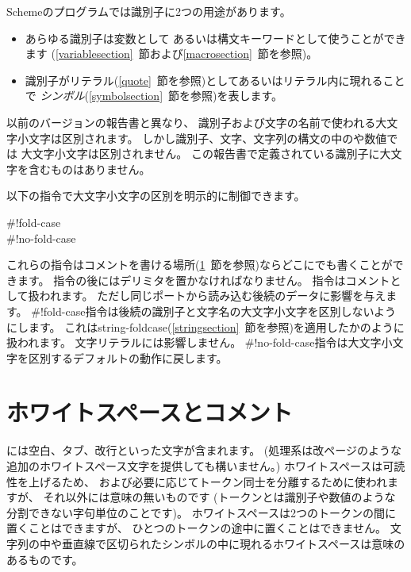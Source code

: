 \vest Schemeのプログラムでは識別子に2つの用途があります。
\begin{itemize}
\item あらゆる識別子は変数として
あるいは構文キーワードとして使うことができます
(\ref{variablesection}~節および\ref{macrosection}~節を参照)。

\item 識別子がリテラル(\ref{quote}~節を参照)としてあるいはリテラル内に現れることで
{\em シンボル}(\ref{symbolsection}~節を参照)を表します。
\end{itemize}

以前のバージョンの報告書\cite{R5RS}と異なり、
識別子および文字の名前で使われる大文字小文字は区別されます。
しかし識別子、文字、文字列の構文の中のや数値では
大文字小文字は区別されません。
この報告書で定義されている識別子に大文字を含むものはありません。

以下の指令で大文字小文字の区別を明示的に制御できます。

\begin{entry}{%
{\cf{}\#!fold-case}\\
{\cf{}\#!no-fold-case}}

これらの指令はコメントを書ける場所(\ref{wscommentsection}~節を参照)ならどこにでも書くことができます。
指令の後にはデリミタを置かなければなりません。
指令はコメントとして扱われます。
ただし同じポートから読み込む後続のデータに影響を与えます。
{\cf{}\#!fold-case}指令は後続の識別子と文字名の大文字小文字を区別しないようにします。
これは{\cf string-foldcase}(\ref{stringsection}~節を参照)を適用したかのように扱われます。
文字リテラルには影響しません。
{\cf{}\#!no-fold-case}指令は大文字小文字を区別するデフォルトの動作に戻します。
\end{entry}



\section{ホワイトスペースとコメント}
\label{wscommentsection}

には空白、タブ、改行といった文字が含まれます。
(処理系は改ページのような追加のホワイトスペース文字を提供しても構いません。)
ホワイトスペースは可読性を上げるため、
および必要に応じてトークン同士を分離するために使われますが、
それ以外には意味の無いものです
(トークンとは識別子や数値のような分割できない字句単位のことです)。
ホワイトスペースは2つのトークンの間に置くことはできますが、
ひとつのトークンの途中に置くことはできません。
文字列の中や垂直線で区切られたシンボルの中に現れるホワイトスペースは意味のあるものです。

